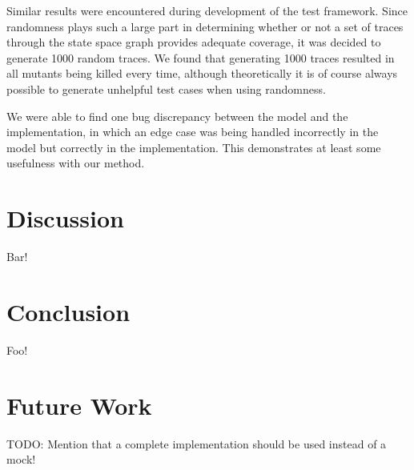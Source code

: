 \documentclass{article}
\begin{document}
		Similar results were encountered during development of the test framework. Since randomness plays such a large part in determining whether or not a set of traces through the state space graph provides adequate coverage, it was decided to generate 1000 random traces. We found that generating 1000 traces resulted in all mutants being killed every time, although theoretically it is of course always possible to generate unhelpful test cases when using randomness.

		We were able to find one bug discrepancy between the model and the implementation, in which an edge case was being handled incorrectly in the model but correctly in the implementation. This demonstrates at least some usefulness with our method.

	\section{Discussion}
		Bar!

	\section{Conclusion}
		Foo!

	\section{Future Work}
		TODO: Mention that a complete implementation should be used instead of a mock!



\end{document}

